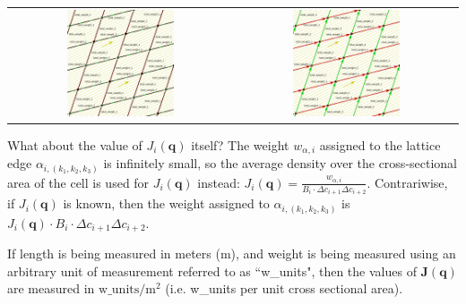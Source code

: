 \documentclass{book}
\begin{document}
\begin{center}
\begin{tabular}{cc}
\parbox{0.5\textwidth}{
\includegraphics[width = 0.5\textwidth]{Coordinate_systems/path_density_2D_stage_1}
} & \parbox{0.5\textwidth}{
\includegraphics[width = 0.5\textwidth]{Coordinate_systems/path_density_2D_stage_2}
}
\end{tabular}
\end{center}

What about the value of \(J_i(\mathbf{q})\) itself? The weight \(w_{\alpha,i}\) assigned to the lattice edge \(\alpha_{i, (k_1,k_2,k_3)}\) is infinitely small, so the average density over the cross-sectional area of the cell is used for \(J_i(\mathbf{q})\) instead: \(J_i(\mathbf{q}) = \frac{w_{\alpha,i}}{B_i \cdot \Delta c_{i+1} \Delta c_{i+2}}\). Contrariwise, if \(J_i(\mathbf{q})\) is known, then the weight assigned to \(\alpha_{i, (k_1,k_2,k_3)}\) is \(J_i(\mathbf{q}) \cdot B_i \cdot \Delta c_{i+1} \Delta c_{i+2}\).

If length is being measured in meters (m), and weight is being measured using an arbitrary unit of measurement referred to as ``w\_units", then the values of \(\mathbf{J}(\mathbf{q})\) are measured in \(\text{w\_units}/\text{m}^2\) (i.e. w\_units per unit cross sectional area).
\end{document}
